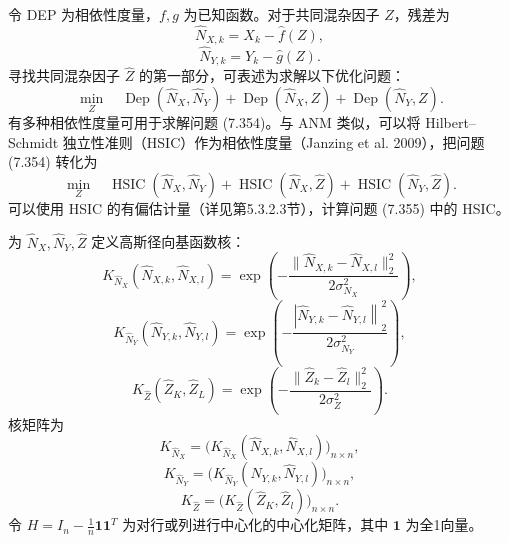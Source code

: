 令 DEP 为相依性度量，$f,g$ 为已知函数。对于共同混杂因子 $\widehat Z$，残差为
\begin{equation}
\widehat N_{X,k}=X_k-\widehat f(Z),
\tag{7.352}
\end{equation}
\begin{equation}
\widehat N_{Y,k}=Y_k-\widehat g(Z).
\tag{7.353}
\end{equation}
寻找共同混杂因子 $\widehat Z$ 的第一部分，可表述为求解以下优化问题：
\begin{equation}
\min_Z\quad \operatorname{Dep}(\widehat N_X,\widehat N_Y)
+\operatorname{Dep}(\widehat N_X,Z)+\operatorname{Dep}(\widehat N_Y,Z).
\tag{7.354}
\end{equation}
有多种相依性度量可用于求解问题 (7.354)。与 ANM 类似，可以将 Hilbert–Schmidt 独立性准则（HSIC）作为相依性度量（Janzing et al. 2009），把问题 (7.354) 转化为
\begin{equation}
\min_Z\quad \operatorname{HSIC}(\widehat N_X,\widehat N_Y)
+\operatorname{HSIC}(\widehat N_X,\widehat Z)
+\operatorname{HSIC}(\widehat N_Y,\widehat Z).
\tag{7.355}
\end{equation}
可以使用 HSIC 的有偏估计量（详见第5.3.2.3节），计算问题 (7.355) 中的 HSIC。

为 $\widehat N_X,\widehat N_Y,\widehat Z$ 定义高斯径向基函数核：
\begin{equation}
K_{\widehat N_X}(\widehat N_{X,k},\widehat N_{X,l})
=\exp\left(-\frac{\|\widehat N_{X,k}-\widehat N_{X,l}\|_2^2}{2\sigma_{N_X}^2}\right),
\tag{7.356}
\end{equation}
\begin{equation}
K_{\widehat N_Y}(\widehat N_{Y,k},\widehat N_{Y,l})
=\exp\left(-\frac{\left|\widehat N_{Y,k}-\widehat N_{Y,l}\right\|_2^2}{2\sigma_{N_Y}^2}\right),
\tag{7.357}
\end{equation}
\begin{equation}
K_{\widehat Z}(\widehat Z_K,\widehat Z_L)
=\exp\left(-\frac{\|\widehat Z_k-\widehat Z_l\|_2^2}{2\sigma_Z^2}\right).
\tag{7.358}
\end{equation}
核矩阵为
\begin{equation}
K_{\widehat N_X}=\bigl(K_{\widehat N_X}(\widehat N_{X,k},\widehat N_{X,l})\bigr)_{n\times n},
\tag{7.359}
\end{equation}
\begin{equation}
K_{\widehat N_Y}=\bigl(K_{\widehat N_Y}(\widehat N_{Y,k},\widehat N_{Y,l})\bigr)_{n\times n},
\tag{7.360}
\end{equation}
\begin{equation}
K_{\widehat Z}=\bigl(K_{\widehat Z}(\widehat Z_K,\widehat Z_l)\bigr)_{n\times n}.
\tag{7.361}
\end{equation}
令 $H=I_n-\frac1n\mathbf1\mathbf1^T$ 为对行或列进行中心化的中心化矩阵，其中 $\mathbf1$ 为全1向量。

